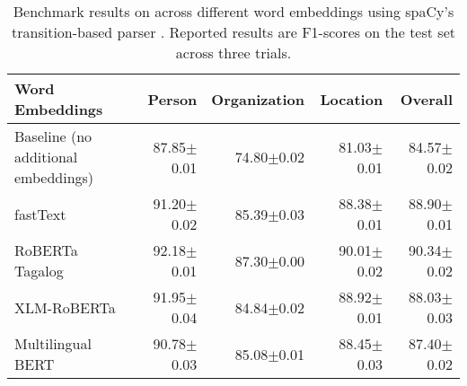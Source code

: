 \documentclass[../report.tex]{subfiles}
\begin{document}
\begin{table*}[t]
\centering
\begin{tabular}{@{}lrrrr@{}}
\toprule
Word Embeddings & Person & Organization &  Location  & Overall       \\ \midrule
Baseline (no additional embeddings)          & 87.85$\pm$0.01 & 74.80$\pm$0.02 & 81.03$\pm$0.01 & 84.57$\pm$0.02 \\ 
fastText  \cite{Bojanowski2016EnrichingWV}   & 91.20$\pm$0.02 & 85.39$\pm$0.03 & 88.38$\pm$0.01 & 88.90$\pm$0.01 \\ 
RoBERTa Tagalog \cite{Cruz2021ImprovingLL}   & 92.18$\pm$0.01 & 87.30$\pm$0.00 & 90.01$\pm$0.02 & 90.34$\pm$0.02 \\
XLM-RoBERTa \cite{Conneau2019UnsupervisedCR} & 91.95$\pm$0.04 & 84.84$\pm$0.02 & 88.92$\pm$0.01 & 88.03$\pm$0.03\\
Multilingual BERT \cite{Devlin2019BERTPO}    & 90.78$\pm$0.03 & 85.08$\pm$0.01 & 88.45$\pm$0.03 & 87.40$\pm$0.02 \\
\bottomrule
\end{tabular}
\caption{
    Benchmark results on \tlunified{} across different word embeddings using spaCy's transition-based parser \cite{Honnibal2020Spacy}.
    Reported results are F1-scores on the test set across three trials.
}
\label{table:results_baseline}
\end{table*}
\end{document}
